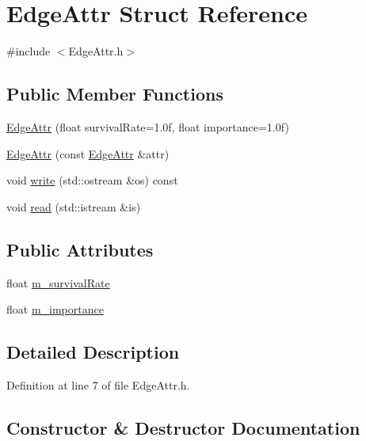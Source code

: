 \hypertarget{struct_edge_attr}{}\section{Edge\+Attr Struct Reference}
\label{struct_edge_attr}


{\ttfamily \#include $<$Edge\+Attr.\+h$>$}

\subsection*{Public Member Functions}
\begin{DoxyCompactItemize}
\item 
\mbox{\hyperlink{struct_edge_attr_a6f055eafff1a137f3fe97e49508c65f5}{Edge\+Attr}} (float survival\+Rate=1.\+0f, float importance=1.\+0f)
\item 
\mbox{\hyperlink{struct_edge_attr_a0252b91de5679426054a8cd478ebfd1e}{Edge\+Attr}} (const \mbox{\hyperlink{struct_edge_attr}{Edge\+Attr}} \&attr)
\item 
void \mbox{\hyperlink{struct_edge_attr_ae06ea6b6bfd925ea64ce85ca1169411a}{write}} (std\+::ostream \&os) const
\item 
void \mbox{\hyperlink{struct_edge_attr_a337958a03dbbc39c139ee507d73555be}{read}} (std\+::istream \&is)
\end{DoxyCompactItemize}
\subsection*{Public Attributes}
\begin{DoxyCompactItemize}
\item 
float \mbox{\hyperlink{struct_edge_attr_ab59fbd7d336f72ac48294c8c7bb9e4ef}{m\+\_\+survival\+Rate}}
\item 
float \mbox{\hyperlink{struct_edge_attr_a56b31d6b4731ac893c4081e0eab931d0}{m\+\_\+importance}}
\end{DoxyCompactItemize}


\subsection{Detailed Description}


Definition at line 7 of file Edge\+Attr.\+h.



\subsection{Constructor \& Destructor Documentation}
\mbox{\label{struct_edge_attr_a6f055eafff1a137f3fe97e49508c65f5}} 
